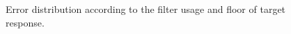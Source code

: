 \begin{figure}[!ht]
\centering
{}
\caption{Error distribution according to the filter usage and floor of target response.}
\label{fig:6-7}
\end{figure}

